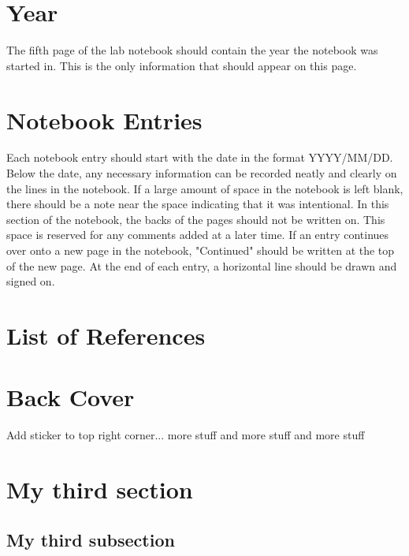 \documentclass[11pt, oneside]{article}   	%
\begin{document}
\section{Year}

The fifth page of the lab notebook should contain the year the notebook was started in. This is the only information that should appear on this page.

\section{Notebook Entries}

Each notebook entry should start with the date in the format YYYY/MM/DD. Below the date, any necessary information can be recorded neatly and clearly on the lines in the notebook. If a large amount of space in the notebook is left blank, there should be a note near the space indicating that it was intentional. In this section of the notebook, the backs of the pages should not be written on. This space is reserved for any comments added at a later time. If an entry continues over onto a new page in the notebook, "Continued" should be written at the top of the new page. At the end of each entry, a horizontal line should be drawn and signed on. 

\section{List of References}
\section{Back Cover}	
Add sticker to top right corner...	
more stuff	and more stuff	and more stuff %



\section{My third section}				%
\subsection{My third subsection}		%





\newpage							%

\end{document}
